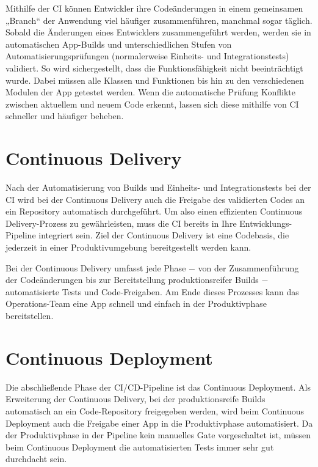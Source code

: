 Mithilfe der CI können Entwickler ihre Codeänderungen in einem gemeinsamen „Branch“ der Anwendung viel häufiger zusammenführen, manchmal sogar täglich. Sobald die Änderungen eines Entwicklers zusammengeführt werden, werden sie in automatischen App-Builds und unterschiedlichen Stufen von Automatisierungsprüfungen (normalerweise Einheits- und Integrationstests) validiert. So wird sichergestellt, dass die Funktionsfähigkeit nicht beeinträchtigt wurde. Dabei müssen alle Klassen und Funktionen bis hin zu den verschiedenen Modulen der App getestet werden. Wenn die automatische Prüfung Konflikte zwischen aktuellem und neuem Code erkennt, lassen sich diese mithilfe von CI schneller und häufiger beheben.\autocite{whatIsCICD}

\section{Continuous Delivery}

Nach der Automatisierung von Builds und Einheits- und Integrationstests bei der CI wird bei der Continuous Delivery auch die Freigabe des validierten Codes an ein Repository automatisch durchgeführt. Um also einen effizienten Continuous Delivery-Prozess zu gewährleisten, muss die CI bereits in Ihre Entwicklungs-Pipeline integriert sein. Ziel der Continuous Delivery ist eine Codebasis, die jederzeit in einer Produktivumgebung bereitgestellt werden kann.\autocite{whatIsCICD}

Bei der Continuous Delivery umfasst jede Phase − von der Zusammenführung der Codeänderungen bis zur Bereitstellung produktionsreifer Builds − automatisierte Tests und Code-Freigaben. Am Ende dieses Prozesses kann das Operations-Team eine App schnell und einfach in der Produktivphase bereitstellen.\autocite{whatIsCICD}

\section{Continuous Deployment}

Die abschließende Phase der CI/CD-Pipeline ist das Continuous Deployment. Als Erweiterung der Continuous Delivery, bei der produktionsreife Builds automatisch an ein Code-Repository freigegeben werden, wird beim Continuous Deployment auch die Freigabe einer App in die Produktivphase automatisiert. Da der Produktivphase in der Pipeline kein manuelles Gate vorgeschaltet ist, müssen beim Continuous Deployment die automatisierten Tests immer sehr gut durchdacht sein.\autocite{whatIsCICD}

